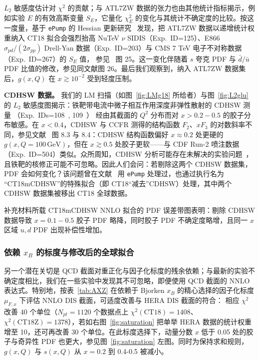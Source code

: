 $L_2$ 敏感度估计对 $\chi^2$ 的贡献；与 ATL7ZW 数据的张力也由其他统计指标揭示，例如实验 $E$ 的有效高斯变量 $S_E$，它量化 $\chi^2_E$ 的变化与其统计不确定度的比较。按这一度量，基于 \texttt{ePump} 的 Hessian 更新研究~\cite{Hou:2019gfw} 发现，把 ATL7ZW 数据以递增统计权重纳入 CT18 拟合会强烈抬高 NuTeV $\nu$ SIDIS（Exp.~ID=125）、E866 $\sigma_{pd}/(2\sigma_{pp})$ Drell-Yan 数据（Exp.~ID=203）与 CMS 7 TeV 电子不对称数据（Exp.~ID=267）的 $S_E$ 值，
参见~\cite{Hou:2019gfw} 图 25。这一变化伴随着 $s$ 夸克 PDF 与 $\bar{d}/\bar{u}$ PDF 比值的修改，参见同文献图 26。最后我们观察到，纳入 ATL7ZW 数据集后，$g(x,Q)$ 在 $x \gtrsim 10^{-2}$ 受到轻度压制。

{\bf CDHSW 数据。}
我们的 LM 扫描（如图~\ref{fig:LMg18} 所给者）与图~\ref{fig:L2glu} 的 $L_2$ 敏感度图揭示：铁靶带电流中微子相互作用深度非弹性散射的 CDHSW 测量
（Exp.~IDs=108~\cite{Berge:1989hr}, 109~\cite{Berge:1989hr}）
经由其截面的 $Q^2$
分布而对 $x > 0.2-0.5$ 的胶子分布敏感。在 $x <0.4$，CDHSW
与 CCFR 测得的结构函数 $F_2$、$xF_3$ 的对数斜率不同，参见文献~\cite{Seligman:1997fe} 图 8.3 与 8.4：CDHSW 结构函数偏好 $x\!\approx\!0.2$ 处更硬的 $g(x,Q\!=\!100\,\mathrm{GeV})$，但在 $x\!\gtrsim\!0.5$ 处胶子更软——与 CDF Run-2 喷注数据（Exp.~ID=504）类似。众所周知，CDHSW 分析可能存在未解决的实验问题~\cite{Barone:1999yv}，且铁靶的核修正可能不可忽略。因此人们会问：若剔除这两个 CDHSW 数据集，PDF 会如何变化？该问题曾在文献~\cite{Hou:2019gfw} 用 \texttt{ePump} 处理过，也通过执行名为
``CT18mCDHSW''的特殊拟合（即 CT18``减去''CDHSW）处理，其中两个 CDHSW 数据集被移出 CT18 全球数据。

补充材料所载 CT18mCDHSW NNLO 拟合的 PDF 误差带图表明：剔除 CDHSW 数据导致 $x=0.1-0.5$ 胶子 PDF 略降，同时胶子 PDF 不确定度略增，且同一 $x$ 区域 $u,d$ PDF 出现补偿性增加。

\subsubsection{依赖 $x_B$ 的标度与修改后的全球拟合}
%
另一个潜在关切是 QCD 截面对重正化与因子化标度的残余依赖；与最新的实验不确定度相比，我们在一些实验中发现其不可忽略，即便使用 QCD 截面的 NNLO 表达式。特别地，按表~\ref{tab:AXZ} 在依赖于 Bjorken $x_B$ 的精心选择的因子化标度 $\mu_{F,x}$ 下评估 NNLO DIS 截面，可适度改善与 HERA DIS 截面的符合：
相应 $\chi^2$ 改善 40 个单位（$N_{pt}=1120$ 个数据点上 $\chi^2(\mbox{CT18})=1408$、$\chi^2(\mbox{CT18Z})=1378$），若如右图~\ref{fig:saturation} 把单举 HERA 数据的统计权重增至 10，还可再改善 30 个单位。在此标度选择下，动量分数 $x$ 低于 0.05 处的胶子与奇异性 PDF 也更大，参见图~\ref{fig:saturation} 左图。同时为保持求和规则，$g(x,Q)$ 与 $s(x,Q)$ 从 $x=0.2$ 到 0.4-0.5 被减小。

